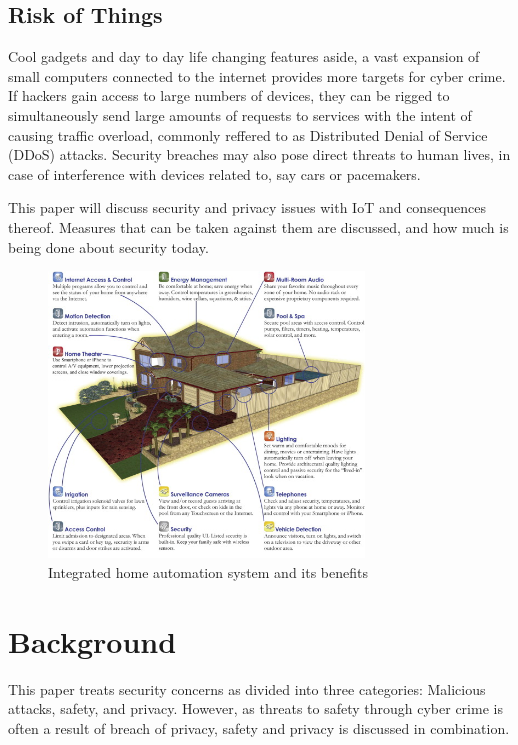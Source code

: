 \documentclass[a4paper, conference]{IEEEtran/IEEEtran}
\begin{document}
\subsection{Risk of Things}
Cool gadgets and day to day life changing features aside, a vast expansion of small computers connected to the internet provides more targets for cyber crime. If hackers gain access to large numbers of devices, they can be rigged to simultaneously send large amounts of requests to services with the intent of causing traffic overload, commonly reffered to as Distributed Denial of Service (DDoS) attacks.\cite{ddos} Security breaches may also pose direct threats to human lives, in case of interference with devices related to, say cars or pacemakers.\cite{windriver}

This paper will discuss security and privacy issues with IoT and consequences thereof. Measures that can be taken against them are discussed, and how much is being done about security today.

\begin{figure}[!t]
\centering
\includegraphics[width=3.3in]{assets/raspberry.jpg}
	\caption{Integrated home automation system and its benefits\cite{raspberrysensor}}
\label{fig:raspberry}
\end{figure}

\section{Background}
This paper treats security concerns as divided into three categories: Malicious attacks, safety, and privacy. However, as threats to safety through cyber crime is often a result of breach of privacy, safety and privacy is discussed in combination. 
\end{document}
